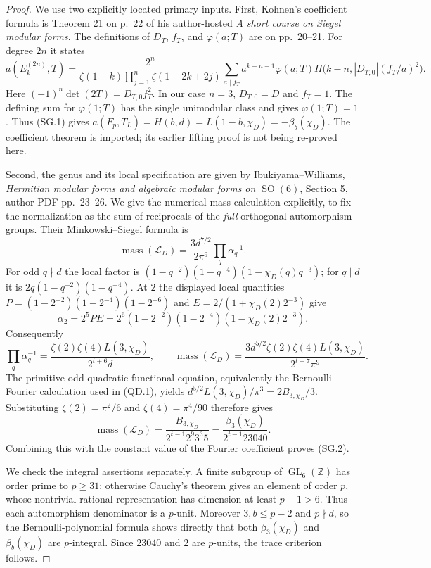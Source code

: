 \documentclass[11pt,a4paper]{article}
\theoremstyle{definition}
\begin{document}
\begin{proof}
We use two explicitly located primary inputs.  First, Kohnen's
coefficient formula is Theorem 21 on p.~22 of his author-hosted
\emph{A short course on Siegel modular forms}.  The definitions of
$D_T$, $f_T$, and $\varphi(a;T)$ are on pp.~20--21.
For degree $2n$ it states
\[
 a(E_k^{(2n)},T)=
 \frac{2^n}{\zeta(1-k)\prod_{j=1}^n\zeta(1-2k+2j)}
 \sum_{a\mid f_T}a^{k-n-1}\varphi(a;T)
 H\bigl(k-n,|D_{T,0}|(f_T/a)^2\bigr).
\]
Here $(-1)^n\det(2T)=D_{T,0}f_T^2$.  In our case $n=3$,
$D_{T,0}=D$ and $f_T=1$.  The defining sum for $\varphi(1;T)$
has the single unimodular class and gives $\varphi(1;T)=1$.
Thus (SG.1) gives
$a(F_p,T_L)=H(b,d)=L(1-b,\chi_D)=-\beta_b(\chi_D)$.
The coefficient theorem is imported; its earlier lifting proof is not
being re-proved here.

Second, the genus and its local specification are given by
Ibukiyama--Williams, \emph{Hermitian modular forms and algebraic
modular forms on $\operatorname{SO}(6)$}, Section 5, author PDF
pp.~23--26.  We give the numerical mass calculation explicitly, to
fix the normalization as the sum of reciprocals of the \emph{full}
orthogonal automorphism groups.  Their Minkowski--Siegel formula is
\[
 \operatorname{mass}(\mathcal L_D)
   =\frac{3d^{7/2}}{2\pi^9}\prod_q\alpha_q^{-1}.
\]
For odd $q\nmid d$ the local factor is
$(1-q^{-2})(1-q^{-4})(1-\chi_D(q)q^{-3})$; for $q\mid d$ it is
$2q(1-q^{-2})(1-q^{-4})$.  At $2$ the displayed local quantities
$P=(1-2^{-2})(1-2^{-4})(1-2^{-6})$ and
$E=2/(1+\chi_D(2)2^{-3})$ give
\[
 \alpha_2=2^5PE
 =2^6(1-2^{-2})(1-2^{-4})(1-\chi_D(2)2^{-3}).
\]
Consequently
\[
 \prod_q\alpha_q^{-1}
   =\frac{\zeta(2)\zeta(4)L(3,\chi_D)}{2^{t+6}d},
 \qquad
 \operatorname{mass}(\mathcal L_D)
   =\frac{3d^{5/2}\zeta(2)\zeta(4)L(3,\chi_D)}
                         {2^{t+7}\pi^9}.
\]
The primitive odd quadratic functional equation, equivalently the
Bernoulli Fourier calculation used in (QD.1), yields
$d^{5/2}L(3,\chi_D)/\pi^3=2B_{3,\chi_D}/3$.
Substituting $\zeta(2)=\pi^2/6$ and
$\zeta(4)=\pi^4/90$ therefore gives
\begin{equation}
 \operatorname{mass}(\mathcal L_D)
   =\frac{B_{3,\chi_D}}{2^{t-1}2^9 3^3 5}
   =\frac{\beta_3(\chi_D)}{2^{t-1}23040}.
 \tag{SG.3}
\end{equation}
Combining this with the constant value of the Fourier coefficient
proves (SG.2).

We check the integral assertions separately.  A finite subgroup of
$\operatorname{GL}_6(\mathbb Z)$ has order prime to $p\geq31$:
otherwise Cauchy's theorem gives an element of order $p$, whose
nontrivial rational representation has dimension at least $p-1>6$.
Thus each automorphism denominator is a $p$-unit.  Moreover
$3,b\leq p-2$ and $p\nmid d$, so the Bernoulli-polynomial formula
shows directly that both $\beta_3(\chi_D)$ and $\beta_b(\chi_D)$
are $p$-integral.  Since $23040$ and $2$ are $p$-units, the trace
criterion follows.


\end{proof}
\end{document}

